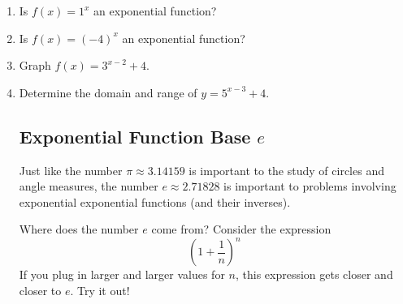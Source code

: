 \begin{enumerate}

\item Is $f(x)=1^x$ an exponential function?
  \vfill

\item Is $f(x)=(-4)^x$ an exponential function?
  \vfill

\item Graph $f(x)=3^{x-2}+4.$


\item Determine the domain and range of $y=5^{x-3}+4$.  \\[1in]





\subsection{Exponential Function Base $e$} 
Just like the number $\pi \approx 3.14159$ is important to the study
of circles and angle measures, the number $e \approx 2.71828$ is
important to problems involving exponential exponential functions (and
their inverses).

Where does the number $e$ come from? Consider the
expression $$\left(1+\frac{1}{n}\right)^n$$ If you plug in larger and
larger values for $n$, this expression gets closer and closer to $e$.
Try it out!


\end{enumerate}
